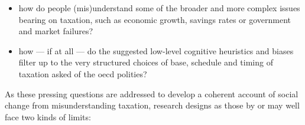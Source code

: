 \begin{itemize}
	\item how do people (mis)understand some of the broader and more complex issues bearing on taxation, such as economic growth, savings rates or government and market failures?

	\item how --- if at all --- do the suggested low-level cognitive heuristics and biases filter up to the very structured choices of base, schedule and timing of taxation asked of the \gls{oecd} polities?
\end{itemize}

As these pressing questions are addressed to develop a coherent account of social change from misunderstanding taxation, research
designs as those by \citeauthor{McCafferyBaron2004} or \citeauthor{SausgruberTyran2011} may well face two kinds of limits:

